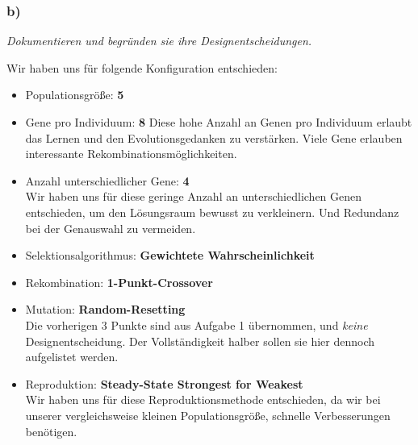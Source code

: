 \documentclass[12pt, a4paper]{article}
\begin{document}
\subsubsection*{b)}
\textit{Dokumentieren und begründen sie ihre Designentscheidungen.}

Wir haben uns für folgende Konfiguration entschieden:

\begin{itemize}
\item Populationsgröße: \textbf{5}
\item Gene pro Individuum: \textbf{8}
Diese hohe Anzahl an Genen pro Individuum erlaubt das Lernen und den
Evolutionsgedanken zu verstärken. Viele Gene erlauben interessante Rekombinationsmöglichkeiten.
\item Anzahl unterschiedlicher Gene: \textbf{4}\\
Wir haben uns für diese geringe Anzahl an unterschiedlichen Genen
entschieden, um den Lösungsraum bewusst zu verkleinern. Und Redundanz
bei der Genauswahl zu vermeiden.
\item Selektionsalgorithmus: \textbf{Gewichtete Wahrscheinlichkeit}
\item Rekombination: \textbf{1-Punkt-Crossover}
\item Mutation: \textbf{Random-Resetting}\\
Die vorherigen 3 Punkte sind aus Aufgabe 1 übernommen, und
\textit{keine} Designentscheidung. Der Vollständigkeit halber sollen sie hier
dennoch aufgelistet werden.
\item Reproduktion: \textbf{Steady-State Strongest for Weakest}\\
Wir haben uns für diese Reproduktionsmethode entschieden, da wir bei
unserer vergleichsweise kleinen Populationsgröße, schnelle
Verbesserungen benötigen.

\end{itemize}
\end{document}
